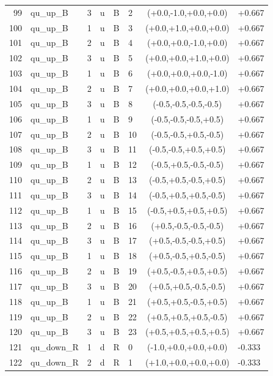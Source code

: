 \begin{longtable}{rlllllcl}
99 & qu\_up\_B & 3 & u & B & 2 & (+0.0,-1.0,+0.0,+0.0) & +0.667 \\
100 & qu\_up\_B & 1 & u & B & 3 & (+0.0,+1.0,+0.0,+0.0) & +0.667 \\
101 & qu\_up\_B & 2 & u & B & 4 & (+0.0,+0.0,-1.0,+0.0) & +0.667 \\
102 & qu\_up\_B & 3 & u & B & 5 & (+0.0,+0.0,+1.0,+0.0) & +0.667 \\
103 & qu\_up\_B & 1 & u & B & 6 & (+0.0,+0.0,+0.0,-1.0) & +0.667 \\
104 & qu\_up\_B & 2 & u & B & 7 & (+0.0,+0.0,+0.0,+1.0) & +0.667 \\
105 & qu\_up\_B & 3 & u & B & 8 & (-0.5,-0.5,-0.5,-0.5) & +0.667 \\
106 & qu\_up\_B & 1 & u & B & 9 & (-0.5,-0.5,-0.5,+0.5) & +0.667 \\
107 & qu\_up\_B & 2 & u & B & 10 & (-0.5,-0.5,+0.5,-0.5) & +0.667 \\
108 & qu\_up\_B & 3 & u & B & 11 & (-0.5,-0.5,+0.5,+0.5) & +0.667 \\
109 & qu\_up\_B & 1 & u & B & 12 & (-0.5,+0.5,-0.5,-0.5) & +0.667 \\
110 & qu\_up\_B & 2 & u & B & 13 & (-0.5,+0.5,-0.5,+0.5) & +0.667 \\
111 & qu\_up\_B & 3 & u & B & 14 & (-0.5,+0.5,+0.5,-0.5) & +0.667 \\
112 & qu\_up\_B & 1 & u & B & 15 & (-0.5,+0.5,+0.5,+0.5) & +0.667 \\
113 & qu\_up\_B & 2 & u & B & 16 & (+0.5,-0.5,-0.5,-0.5) & +0.667 \\
114 & qu\_up\_B & 3 & u & B & 17 & (+0.5,-0.5,-0.5,+0.5) & +0.667 \\
115 & qu\_up\_B & 1 & u & B & 18 & (+0.5,-0.5,+0.5,-0.5) & +0.667 \\
116 & qu\_up\_B & 2 & u & B & 19 & (+0.5,-0.5,+0.5,+0.5) & +0.667 \\
117 & qu\_up\_B & 3 & u & B & 20 & (+0.5,+0.5,-0.5,-0.5) & +0.667 \\
118 & qu\_up\_B & 1 & u & B & 21 & (+0.5,+0.5,-0.5,+0.5) & +0.667 \\
119 & qu\_up\_B & 2 & u & B & 22 & (+0.5,+0.5,+0.5,-0.5) & +0.667 \\
120 & qu\_up\_B & 3 & u & B & 23 & (+0.5,+0.5,+0.5,+0.5) & +0.667 \\
121 & qu\_down\_R & 1 & d & R & 0 & (-1.0,+0.0,+0.0,+0.0) & -0.333 \\
122 & qu\_down\_R & 2 & d & R & 1 & (+1.0,+0.0,+0.0,+0.0) & -0.333 \\

\end{longtable}

